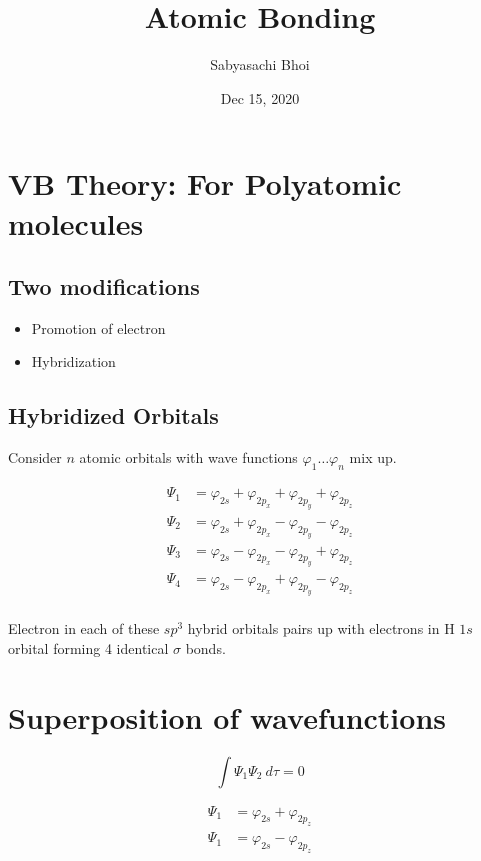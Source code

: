 \documentclass[12pt]{article}
\theoremstyle{definition}
\begin{document}
\title{Atomic Bonding}
\author{Sabyasachi Bhoi}
\date{Dec 15, 2020}
\maketitle

\section{VB Theory: For Polyatomic molecules}

\subsection{Two modifications}
\begin{itemize}
	\item Promotion of electron
	\item Hybridization
\end{itemize}

\subsection{Hybridized Orbitals}
Consider $n$ atomic orbitals with wave functions $\varphi_1 \dots \varphi_n$ mix up.

\begin{align*}
	\Psi_1 &= \varphi_{2s} + \varphi_{2p_x} + \varphi_{2p_y} + \varphi_{2p_z} \\
	\Psi_2 &= \varphi_{2s} + \varphi_{2p_x} - \varphi_{2p_y} - \varphi_{2p_z} \\
	\Psi_3 &= \varphi_{2s} - \varphi_{2p_x} - \varphi_{2p_y} + \varphi_{2p_z} \\
	\Psi_4 &= \varphi_{2s} - \varphi_{2p_x} + \varphi_{2p_y} - \varphi_{2p_z} \\
\end{align*}

Electron in each of these $sp^3$ hybrid orbitals pairs up with electrons in H $1s$ orbital forming 4 identical $\sigma$ bonds.

\section{Superposition of wavefunctions}

\begin{equation*}
	\int{{\Psi_1 \Psi_2}}\: d{\tau} = 0
\end{equation*}

\begin{align*}
	\Psi_1 &= \varphi_{2s} + \varphi_{2p_z} \\
	\Psi_1 &= \varphi_{2s} - \varphi_{2p_z} \\
\end{align*}
\end{document}
